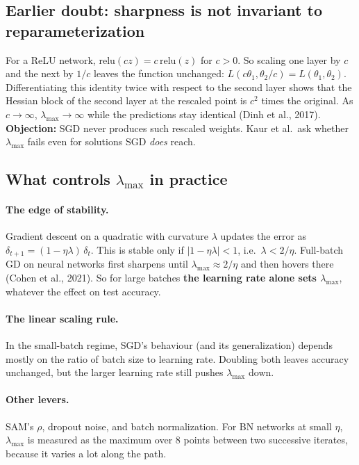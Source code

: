 \documentclass[11pt]{article}
\newcommand{\lmax}{\lambda_{\max}}
\theoremstyle{plain}
\begin{document}
\subsection{Earlier doubt: sharpness is not invariant to reparameterization}

For a ReLU network, $\mathrm{relu}(cz) = c\,\mathrm{relu}(z)$ for $c>0$. So scaling one layer by $c$ and the next by $1/c$ leaves the function unchanged:
$L(c\theta_1, \theta_2/c) = L(\theta_1,\theta_2)$. Differentiating this identity twice with respect to the second layer shows that the Hessian block of the second layer at the
rescaled point is $c^2$ times the original. As $c\to\infty$, $\lmax\to\infty$ while the predictions stay identical (Dinh et al., 2017).
\textbf{Objection:} SGD never produces such rescaled weights. Kaur et al.\ ask whether $\lmax$ fails even for solutions SGD \emph{does} reach.

\subsection{What controls $\lmax$ in practice}

\paragraph{The edge of stability.} Gradient descent on a quadratic with curvature $\lambda$ updates the error as $\delta_{t+1} = (1-\eta\lambda)\,\delta_t$.
This is stable only if $|1-\eta\lambda| < 1$, i.e.\ $\lambda < 2/\eta$. Full-batch GD on neural networks first sharpens until $\lmax \approx 2/\eta$
and then hovers there (Cohen et al., 2021). So for large batches \textbf{the learning rate alone sets $\lmax$}, whatever the effect on test accuracy.

\paragraph{The linear scaling rule.} In the small-batch regime, SGD's behaviour (and its generalization) depends mostly on the ratio of batch size to learning rate.
Doubling both leaves accuracy unchanged, but the larger learning rate still pushes $\lmax$ down.

\paragraph{Other levers.} SAM's $\rho$, dropout noise, and batch normalization. For BN networks at small $\eta$, $\lmax$ is measured as the maximum over 8 points
between two successive iterates, because it varies a lot along the path.
\end{document}
